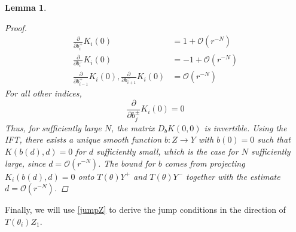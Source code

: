 \documentclass[12pt]{elsarticle}
\newtheorem{lemma}{Lemma}
\begin{document}
\begin{lemma}
\begin{proof}
\begin{align*}
\frac{\partial}{\partial b_i^+}K_i(0) &= 1 + \mathcal{O}(r^{-N})  \\
\frac{\partial}{\partial b_i^-}K_i(0) &= -1 + \mathcal{O}(r^{-N}) \\
\frac{\partial}{\partial b_{i-1}^+}K_i(0),
\frac{\partial}{\partial b_{i+1}^-}K_i(0) &= \mathcal{O}(r^{-N})
\end{align*}
For all other indices,
\[
\frac{\partial}{\partial b_j^\pm}K_i(0) = 0
\]
Thus, for sufficiently large $N$, the matrix $D_b K(0,0)$ is invertible. Using the IFT, there exists a unique smooth function $b: Z \rightarrow Y$ with $b(0) = 0$ such that $K(b(d),d) = 0$ for $d$ sufficiently small, which is the case for $N$ sufficiently large, since $d = \mathcal{O}(r^{-N})$. The bound for $b$ comes from projecting $K_i(b(d), d) = 0$ onto $T(\theta)Y^+$ and $T(\theta)Y^-$ together with the estimate $d = \mathcal{O}(r^{-N})$.
\end{proof}
\end{lemma}

Finally, we will use \eqref{jumpZ} to derive the jump conditions in the direction of $T(\theta_i) Z_1$.
\end{document}
